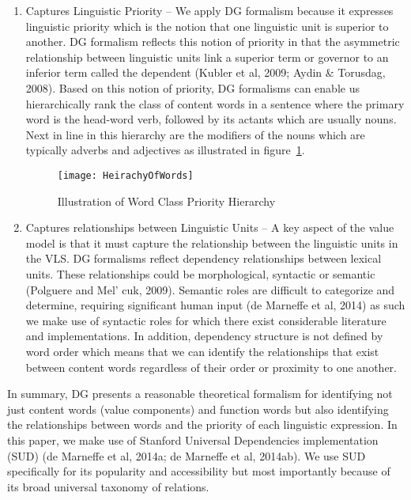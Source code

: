 \begin{enumerate}
\item
Captures Linguistic Priority -- We apply DG formalism because it expresses linguistic priority which is the notion that one linguistic unit is superior to another. DG formalism reflects this notion of priority in that the asymmetric relationship between linguistic units link a superior term or governor to an inferior term called the dependent (Kubler et al, 2009; Aydin & Torusdag, 2008). Based on this notion of priority, DG formalisms can enable us hierarchically rank the class of content words in a sentence where the primary word is the head-word verb, followed by its actants which are usually nouns. Next in line in this hierarchy are the modifiers of the nouns which are typically adverbs and adjectives as illustrated in figure~\ref{fig:three}.

\begin{figure}
  \texttt{[image: HeirachyOfWords]}
  \caption{Illustration of Word Class Priority Hierarchy}
  \label{fig:three}
\end{figure}

\item
Captures relationships between Linguistic Units -- A key aspect of the value model is that it must capture the relationship between the linguistic units in the VLS. DG formalisms reflect dependency relationships between lexical units. These relationships could be morphological, syntactic or semantic (Polguere and Mel’ cuk, 2009). Semantic roles are difficult to categorize and determine, requiring significant human input (de Marneffe et al, 2014) as such we make use of syntactic roles for which there exist considerable literature and implementations. In addition, dependency structure is not defined by word order which means that we can identify the relationships that exist between content words regardless of their order or proximity to one another. 
\end{enumerate}

In summary, DG presents a reasonable theoretical formalism for identifying not just content words (value components) and function words but also identifying the relationships between words and the priority of each linguistic expression. In this paper, we make use of Stanford Universal Dependencies implementation (SUD) (de Marneffe et al, 2014a; de Marneffe et al, 2014ab). We use SUD specifically for its popularity and accessibility but most importantly because of its broad universal taxonomy of relations. 


